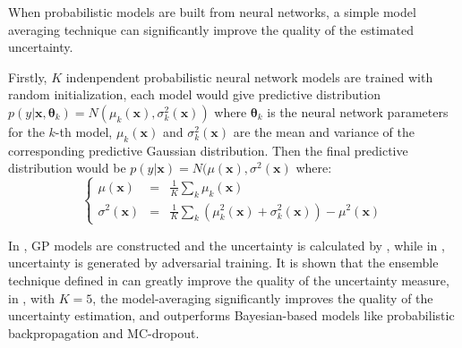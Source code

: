 When probabilistic models are built from neural networks, a simple model averaging technique\cite{lazaro2010marginalized, huang2015scalable, lakshminarayanan2017simple} can significantly improve the quality of the estimated uncertainty.

Firstly, $K$ indenpendent probabilistic neural network models are trained with random initialization, each model would give predictive distribution $p(y | \bm{x}, \bm{\theta}_k) = N(\mu_k(\bm{x}), \sigma_k^2(\bm{x}))$ where $\bm{\theta}_k$ is the neural network parameters for the $k$-th model, $\mu_k(\bm{x})$ and $\sigma_k^2(\bm{x})$ are the mean and variance of the corresponding predictive Gaussian distribution. Then the final predictive distribution would be $p(y | \bm{x}) = N(\mu(\bm{x}), \sigma^2(\bm{x})$ where:
\begin{equation}
    \left\{
        \begin{array}{lll}
            \mu(\bm{x})      &=& \frac{1}{K} \sum_k \mu_k(\bm{x}) \\
            \sigma^2(\bm{x}) &=& \frac{1}{K} \sum_k (\mu_k^2(\bm{x}) + \sigma_k^2(\bm{x})) - \mu^2(\bm{x})
        \end{array}
    \right.
    \label{eq:deepensemble}
\end{equation}

In \cite{lazaro2010marginalized, huang2015scalable}, GP models are constructed and the uncertainty is calculated by , while in \cite{lakshminarayanan2017simple}, uncertainty is generated by adversarial training. It is shown that the ensemble technique defined in  can greatly improve the quality of the uncertainty measure, in \cite{lakshminarayanan2017simple}, with $K = 5$, the model-averaging significantly improves the quality of the uncertainty estimation, and outperforms Bayesian-based models like probabilistic backpropagation\cite{hernandez2015probabilistic} and MC-dropout\cite{gal2016dropout}.
